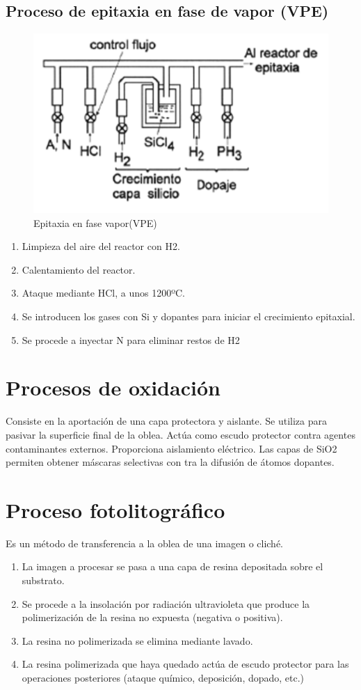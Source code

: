 \subsection{Proceso de epitaxia en fase de vapor (VPE)}

\begin{figure}[H]
    \centering
    \includegraphics[width=0.5\linewidth]{Imagenes/Semiconductores - VPE.png}
    \caption{Epitaxia en fase vapor(VPE)}
\end{figure}

\begin{enumerate}
    \item Limpieza del aire del reactor con H2.
    \item Calentamiento del reactor.
    \item Ataque mediante HCl, a unos 1200ºC.
    \item Se introducen los gases con Si y dopantes para iniciar el crecimiento epitaxial.
    \item Se procede a inyectar N para eliminar restos de H2
\end{enumerate}

\section{Procesos de oxidación}
Consiste en la aportación de una capa protectora y aislante. Se utiliza para pasivar la superficie final de la oblea. Actúa como escudo protector contra agentes contaminantes externos. Proporciona aislamiento eléctrico. Las capas de SiO2 permiten obtener máscaras selectivas con tra la difusión de átomos dopantes.

\section{Proceso fotolitográfico}
Es un método de transferencia a la oblea de una imagen o cliché. 

\begin{enumerate}
    \item La imagen a procesar se pasa a una capa de resina depositada sobre el substrato.
    \item Se procede a la insolación por radiación ultravioleta que produce la polimerización de la resina no expuesta (negativa o positiva).
    \item La resina no polimerizada se elimina mediante lavado.
    \item La resina polimerizada que haya quedado actúa de escudo protector para las operaciones posteriores (ataque químico, deposición, dopado, etc.)
\end{enumerate}

